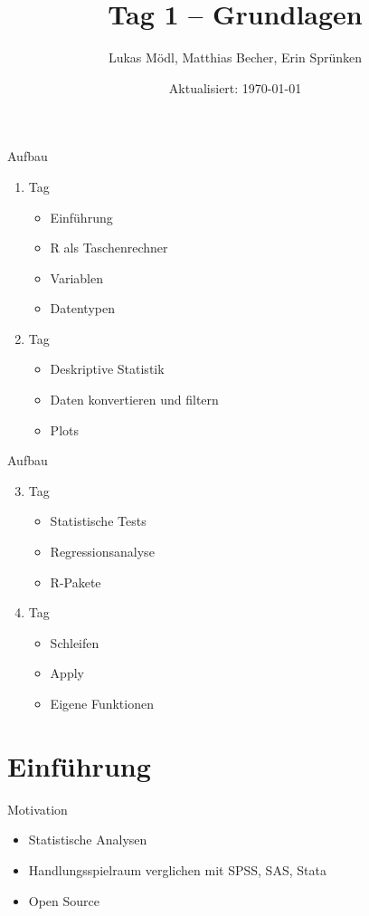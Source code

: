 \documentclass[aspectratio = 169]{chariteBeamer}
\author[L. Mödl, M. Becher, E. Sprünken]{Lukas Mödl, Matthias Becher, Erin Sprünken}
\title{Tag 1 -- Grundlagen}
\date[]{Aktualisiert: \today}
\begin{document}
\begin{frame}[plain]
    \titlepage%
\end{frame}

\begin{frame}[fragile]{Aufbau}
	\begin{enumerate}
		\item Tag
			\begin{itemize}
				\item Einführung
				\item R als Taschenrechner
				\item Variablen
				\item Datentypen
			\end{itemize}
		\item Tag
			\begin{itemize}
				\item Deskriptive Statistik
				\item Daten konvertieren und filtern 
				\item Plots
			\end{itemize}
	\end{enumerate}
\end{frame}

\begin{frame}[fragile]{Aufbau}
	\begin{enumerate}
		\setcounter{enumi}{2}
		\item Tag
			\begin{itemize}
				\item Statistische Tests
				\item Regressionsanalyse
				\item R-Pakete
			\end{itemize}
		\item Tag
			\begin{itemize}
				\item Schleifen
				\item Apply
				\item Eigene Funktionen
			\end{itemize}
	\end{enumerate}
\end{frame}

\frame{\tableofcontents}


\section{Einführung}
\begin{frame}[fragile]{Motivation}
  \begin{itemize}
  \item Statistische Analysen
  \item Handlungsspielraum verglichen mit SPSS, SAS, Stata
  \item Open Source
  \end{itemize}
\end{frame}
\end{document}
